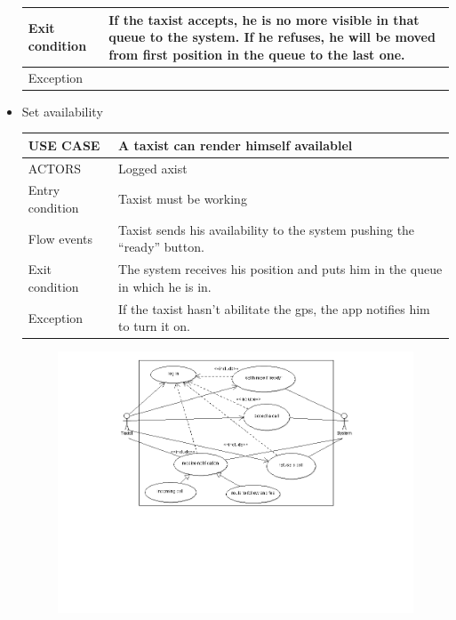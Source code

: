 \begin{itemize}
\begin{center}
\begin{tabular}{ | l | p{11cm} |}
  	   Exit condition & If the taxist accepts, he is no more visible in that queue to the system.
If he refuses, he will be moved from first position in the queue to the last one.\\ \hline
  	   Exception &  \\ \hline
    \end{tabular}
\end{center}
\item Set availability
	\begin{center}
   	 \begin{tabular}{ | l | p{11cm} |}
   	 \hline
   	USE CASE & A taxist can render himself availablel\\ \hline
   	 ACTORS & Logged axist \\ \hline
    	 Entry condition & Taxist must be working \\ \hline
    	 Flow events & Taxist sends his availability to the system pushing the “ready” button.\\ \hline
  	   Exit condition & The system receives his position and puts him in the queue in which he is in.\\ \hline
  	   Exception &  If the taxist hasn’t abilitate the gps, the app notifies him to turn it on.\\ \hline
    \end{tabular}
\end{center}
	\begin{center}
	\begin{figure} [h]
    	\includegraphics [scale=0.5]{taxist.png}
	\end{figure}
	\end{center}
	\newpage


\end{itemize}

